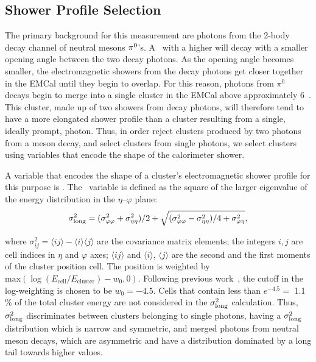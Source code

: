 
\subsection{Shower Profile Selection}
The primary background for this measurement are photons from the 2-body decay channel of neutral mesons $\pi^0$'s. A \pizero~with a higher \pt will decay  with a smaller opening angle between the two decay photons. As the opening angle becomes smaller, the electromagnetic showers from the decay photons get closer together in the EMCal until they begin to overlap. For this reason, photons from $\pi^0$ decays begin to merge into a single cluster in the EMCal above approximately 6~\GeVc. This cluster, made up of two showers from decay photons, will therefore tend to have a more elongated shower profile than a cluster resulting from a single, ideally prompt, photon. Thus, in order reject clusters produced by two photons from a meson decay, and select clusters from single photons, we select clusters using variables that encode the shape of the calorimeter shower. 

A variable that encodes the shape of a cluster's electromagnetic shower profile for this purpose is \lambdasquare. 
The \lambdasquare~variable is defined as the square of the larger eigenvalue of the energy distribution in the $\eta$--$\varphi$ plane:
\begin{equation}
\sigma^{2}_{\mathrm{long}} = (\sigma^{2}_{\varphi\varphi} + \sigma^{2}_{\eta\eta})/2 + \sqrt{(\sigma^{2}_{\varphi\varphi} - \sigma^{2}_{\eta\eta})/4 + \sigma^{2}_{\varphi\eta}},
\end{equation}

where $\sigma^{2}_{ij} = \langle ij \rangle - \langle i \rangle\langle j \rangle$ are the covariance matrix elements; the integers $i,j$ are cell indices in $\eta$ and  $\varphi$ axes; $\langle ij \rangle$ and $\langle i\rangle$, $\langle j\rangle$ are the second and the first moments of the cluster position cell. The position is weighted by $\mathrm{max}\left(\log(E_{\mathrm{cell}}/E_{\mathrm{cluster}}) - w_{0},0\right).$ Following previous work~\cite{Acharya:2018dqe}, the cutoff in the log-weighting is chosen to be $w_{0}=-4.5$. Cells that contain less than {$e^{-4.5} =$ 1.1$\%$} of the total cluster energy are not considered in the $\sigma^{2}_{\mathrm{long}}$ calculation. Thus, $\sigma^{2}_{\mathrm{long}}$ discriminates between clusters belonging to single photons, having a $\sigma^{2}_{\mathrm{long}}$ distribution which is narrow and symmetric, and merged photons from neutral meson decays, which are asymmetric and have a distribution dominated by a long tail towards higher values. 

